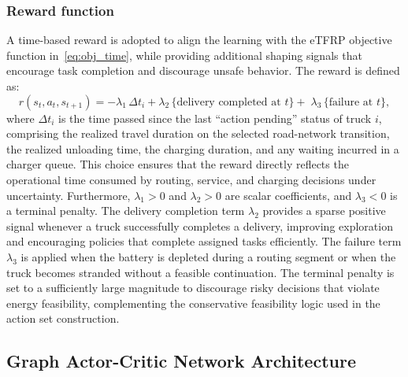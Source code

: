\documentclass[a4paper,fleqn]{cas-sc}
\begin{document}
\subsubsection{Reward function}\label{sec:reward}
A time-based reward is adopted to align the learning with the eTFRP objective function in~\eqref{eq:obj_time}, while providing additional shaping signals that encourage task completion and discourage unsafe behavior.
The reward is defined as:
\begin{equation}
r(s_t,a_t,s_{t+1})
=
-\lambda_1\,\Delta t_i
+\lambda_2\,\{\text{delivery completed at }t\}
+\;\lambda_3\,\{\text{failure at }t\},
\label{eq:reward}
\end{equation}
where $\Delta t_i$ is the time passed since the last ``action pending'' status of truck $i$, comprising the realized travel duration on the selected road-network transition, the realized unloading time, the charging duration, and any waiting incurred in a charger queue.
This choice ensures that the reward directly reflects the operational time consumed by routing, service, and charging decisions under uncertainty. 
Furthermore, $\lambda_1>0$ and $\lambda_2>0$ are scalar coefficients, and $\lambda_3<0$ is a terminal penalty.
The delivery completion term $\lambda_2$ provides a sparse positive signal whenever a truck successfully completes a delivery, improving exploration and encouraging policies that complete assigned tasks efficiently.
The failure term $\lambda_3$ is applied when the battery is depleted during a routing segment or when the truck becomes stranded without a feasible continuation. The terminal penalty is set to a sufficiently large magnitude to discourage risky decisions that violate energy feasibility, complementing the conservative feasibility logic used in the action set construction.

\subsection{Graph Actor-Critic Network Architecture}\label{sec:gnn_arch}
\end{document}

